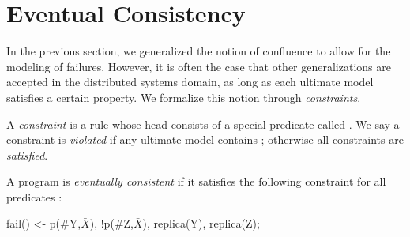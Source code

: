 \section{Eventual Consistency}

In the previous section, we generalized the notion of confluence to allow for the modeling of failures.  However, it is often the case that other generalizations are accepted in the distributed systems domain, as long as each ultimate model satisfies a certain property.  We formalize this notion through {\em constraints}.

\begin{definition}
A {\em constraint} is a rule whose head consists of a special predicate called .  We say a constraint is {\em violated} if any ultimate model contains ; otherwise all constraints are {\em satisfied}.
\end{definition}

%
%


\begin{definition}
A \lang program is {\em eventually consistent} if it satisfies the following constraint for all predicates :

\begin{Dedalus}
fail() <- p(#Y,\(\bar{X}\)), !p(#Z,\(\bar{X}\)), replica(Y), replica(Z);
\end{Dedalus}
\end{definition}

